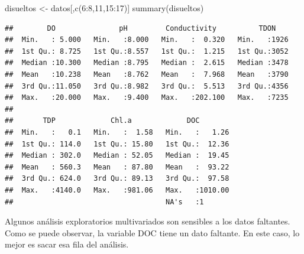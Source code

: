\documentclass[
]{book}
\newenvironment{Shaded}{\begin{snugshade}}{\end{snugshade}}
\newcommand{\DecValTok}[1]{\textcolor[rgb]{0.00,0.00,0.81}{#1}}
\newcommand{\DocumentationTok}[1]{\textcolor[rgb]{0.56,0.35,0.01}{\textbf{\textit{#1}}}}
\newcommand{\FunctionTok}[1]{\textcolor[rgb]{0.00,0.00,0.00}{#1}}
\newcommand{\NormalTok}[1]{#1}
\newcommand{\OtherTok}[1]{\textcolor[rgb]{0.56,0.35,0.01}{#1}}
\newcommand{\SpecialCharTok}[1]{\textcolor[rgb]{0.00,0.00,0.00}{#1}}
\begin{document}
\begin{Shaded}
\begin{Highlighting}[]
\NormalTok{disueltos }\OtherTok{\textless{}{-}}\NormalTok{ datos[,}\FunctionTok{c}\NormalTok{(}\DecValTok{6}\SpecialCharTok{:}\DecValTok{8}\NormalTok{,}\DecValTok{11}\NormalTok{,}\DecValTok{15}\SpecialCharTok{:}\DecValTok{17}\NormalTok{)]}
\FunctionTok{summary}\NormalTok{(disueltos)}
\end{Highlighting}
\end{Shaded}

\begin{verbatim}
##        DO               pH         Conductivity          TDON     
##  Min.   : 5.000   Min.   :8.000   Min.   :  0.320   Min.   :1926  
##  1st Qu.: 8.725   1st Qu.:8.557   1st Qu.:  1.215   1st Qu.:3052  
##  Median :10.300   Median :8.795   Median :  2.615   Median :3478  
##  Mean   :10.238   Mean   :8.762   Mean   :  7.968   Mean   :3790  
##  3rd Qu.:11.050   3rd Qu.:8.982   3rd Qu.:  5.513   3rd Qu.:4356  
##  Max.   :20.000   Max.   :9.400   Max.   :202.100   Max.   :7235  
##                                                                   
##       TDP             Chl.a             DOC         
##  Min.   :   0.1   Min.   :  1.58   Min.   :   1.26  
##  1st Qu.: 114.0   1st Qu.: 15.80   1st Qu.:  12.36  
##  Median : 302.0   Median : 52.05   Median :  19.45  
##  Mean   : 560.3   Mean   : 87.80   Mean   :  93.22  
##  3rd Qu.: 624.0   3rd Qu.: 89.13   3rd Qu.:  97.58  
##  Max.   :4140.0   Max.   :981.06   Max.   :1010.00  
##                                    NA's   :1
\end{verbatim}

Algunos análisis exploratorios multivariados son sensibles a los datos faltantes. Como se puede observar, la variable DOC tiene un dato faltante. En este caso, lo mejor es sacar esa fila del análisis.

\begin{Shaded}
\end{Shaded}
\end{document}
